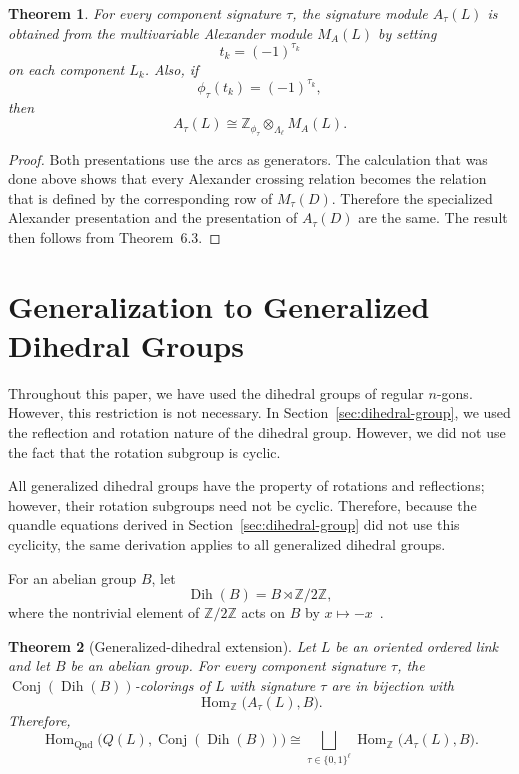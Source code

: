 \documentclass[11pt]{article}
\newtheorem{theorem}{Theorem}[section]
\theoremstyle{definition}
\newcommand{\Z}{\mathbb{Z}}
\newcommand{\Conj}{\operatorname{Conj}}
\newcommand{\HomQnd}{\operatorname{Hom}_{\mathrm{Qnd}}}
\newcommand{\HomZ}{\operatorname{Hom}_{\Z}}
\begin{document}
\begin{theorem}
For every component signature $\tau$, the signature module $A_\tau(L)$ is obtained from the multivariable Alexander module $M_A(L)$ by setting
\[
t_k=(-1)^{\tau_k}
\]
on each component \(L_k\). Also, if
\[
\phi_\tau(t_k)=(-1)^{\tau_k},
\]
then~\cite[Lemma~11]{traldi2018}
\[
A_\tau(L)\cong
\Z_{\phi_\tau}\otimes_{\Lambda_\ell}M_A(L).
\]
\end{theorem}

\begin{proof}
Both presentations use the arcs as generators. The calculation that was done above shows that every Alexander crossing relation becomes the relation that is defined by the corresponding row of $M_\tau(D)$. Therefore the specialized Alexander presentation and the presentation of $A_\tau(D)$ are the same. The result then follows from Theorem~6.3.
\end{proof}

\section{Generalization to Generalized Dihedral Groups}

Throughout this paper, we have used the dihedral groups of regular $n$-gons. However, this restriction is not necessary. In Section~\ref{sec:dihedral-group}, we used the reflection and rotation nature of the dihedral group. However, we did not use the fact that the rotation subgroup is cyclic.

All generalized dihedral groups have the property of rotations and reflections; however, their rotation subgroups need not be cyclic. Therefore, because the quandle equations derived in Section~\ref{sec:dihedral-group} did not use this cyclicity, the same derivation applies to all generalized dihedral groups.

For an abelian group $B$, let
\[
\operatorname{Dih}(B)=B\rtimes\Z/2\Z,
\]
where the nontrivial element of $\Z/2\Z$ acts on $B$ by $x\mapsto-x$~\cite[Sections~2.3.1--2.3.2]{Daugulis2017}.

\begin{theorem}[Generalized-dihedral extension]
Let $L$ be an oriented ordered link and let $B$ be an abelian group. For every component signature $\tau$, the $\Conj(\operatorname{Dih}(B))$-colorings of $L$ with signature $\tau$ are in bijection with
\[
\HomZ\bigl(A_\tau(L),B\bigr).
\]
Therefore,
\[
\HomQnd\bigl(Q(L),\Conj(\operatorname{Dih}(B))\bigr)
\cong
\bigsqcup_{\tau\in\{0,1\}^{\ell}}
\HomZ\bigl(A_\tau(L),B\bigr).
\]
\end{theorem}
\end{document}
